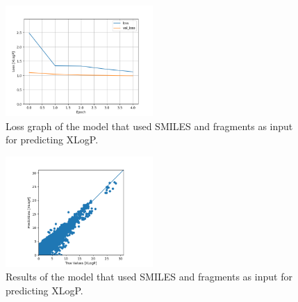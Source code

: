     \begin{figure}
        \centering
        \includegraphics[width=0.5\textwidth]{figures/XLogP_model_2_5_epochs_loss.png}
        \caption{Loss graph of the model that used SMILES and fragments as input for predicting XLogP.}
        \label{fig:frag2-xlogp-loss}
    \end{figure}
    \begin{figure}
        \centering
        \includegraphics[width=0.5\textwidth]{figures/XLogP_model_2_5_epochs_predictions.png}
        \caption{Results of the model that used SMILES and fragments as input for predicting XLogP.}
        \label{fig:frag2-xlogp-predictions}
    \end{figure}
    
